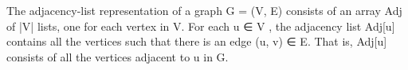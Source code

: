 \documentclass[preview]{standalone}
\begin{document}
\begin{center}
The adjacency-list representation of a graph G = (V, E) consists of an array Adj of |V| lists, one for each vertex in V. For each u ∈ V , the adjacency list Adj[u] contains all the vertices such that there is an edge (u, v) ∈ E. That is, Adj[u] consists of all the vertices adjacent to u in G.
\end{center}
\end{document}

